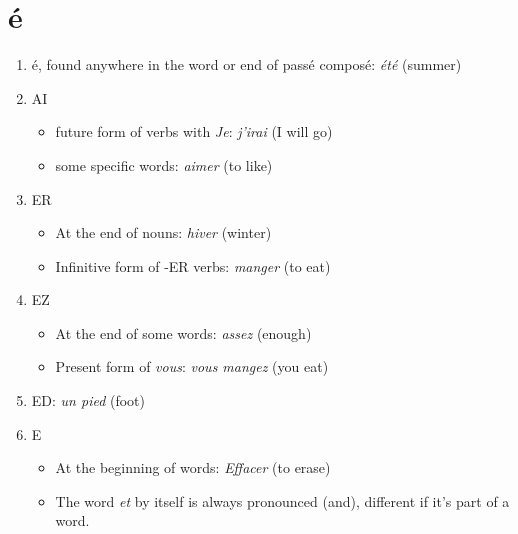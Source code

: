 \documentclass{book}
\begin{document}
    \section{é \textipa{[e]}}
        \begin{enumerate}
            \item é, found anywhere in the word or end of passé composé: \textit{été} \textipa{[ete]} (summer)
            \item AI
            \begin{itemize}
                \item future form of verbs with \textit{Je}: \textit{j'irai} \textipa{[ZirE]} (I will go)
                \item some specific words: \textit{aimer} \textipa{[Eme]} (to like)
            \end{itemize} 
            \item ER
                \begin{itemize}
                    \item At the end of nouns: \textit{hiver} \textipa{[ivE]} (winter)
                    \item Infinitive form of -ER verbs: \textit{manger} \textipa{[m\~{a}Ze]} (to eat)
                \end{itemize}
            \item EZ
                \begin{itemize}
                    \item At the end of some words: \textit{assez} \textipa{[asE]} (enough)
                    \item Present form of \textit{vous}: \textit{vous mangez} \textipa{[vu m\~{a}Ze]} (you eat)
                \end{itemize}
            \item ED: \textit{un pied} \textipa{[\~{œ}pje]} (foot)
            \item E
                \begin{itemize}
                    \item At the beginning of words: \textit{Effacer} \textipa{[efase]} (to erase)
                    \item The word \textit{et} by itself is always pronounced \textipa{[e]} (and), different if it's part of a word.
                \end{itemize}
        \end{enumerate}
\end{document}
